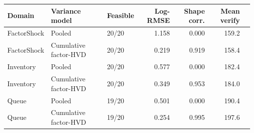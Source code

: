 \begin{tabular}{lllrrrr}
\toprule
Domain & Variance model & Feasible & Log-RMSE & Shape corr. & Mean verify \\
\midrule
FactorShock & Pooled & 20/20 & 1.158 & 0.000 & 159.2 \\
FactorShock & Cumulative factor-HVD & 20/20 & 0.219 & 0.919 & 158.4 \\
\midrule
Inventory & Pooled & 20/20 & 0.577 & 0.000 & 182.4 \\
Inventory & Cumulative factor-HVD & 20/20 & 0.349 & 0.953 & 184.0 \\
\midrule
Queue & Pooled & 19/20 & 0.501 & 0.000 & 190.4 \\
Queue & Cumulative factor-HVD & 19/20 & 0.254 & 0.995 & 197.6 \\
\bottomrule
\end{tabular}
